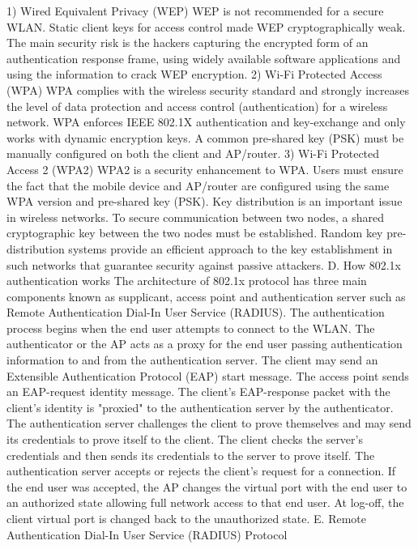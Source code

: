 1) Wired Equivalent Privacy (WEP)
WEP is not recommended for a secure WLAN. Static client keys for access control made WEP cryptographically weak. The main security risk is the hackers capturing the encrypted form of an authentication response frame, using widely available software applications and using the information to crack WEP encryption. 
2) Wi-Fi Protected Access (WPA)
WPA complies with the wireless security standard and strongly increases the level of data protection and access control (authentication) for a wireless network. WPA enforces IEEE 802.1X authentication and key-exchange and only works with dynamic encryption keys. A common pre-shared key (PSK) must be manually configured on both the client and AP/router.
3) Wi-Fi Protected Access 2 (WPA2)
WPA2 is a security enhancement to WPA. Users must ensure the fact that the mobile device and AP/router are configured using the same WPA version and pre-shared key (PSK).
Key distribution is an important issue in wireless networks. To secure communication between two nodes, a shared cryptographic key between the two nodes must be established. Random key pre-distribution systems provide an efficient approach to the key establishment in such networks that guarantee security against passive attackers.
D. How 802.1x authentication works
The architecture of 802.1x protocol has three main components known as supplicant, access point and authentication server such as Remote Authentication Dial-In User Service (RADIUS). The authentication process begins when the end user attempts to connect to the WLAN. The authenticator or the AP acts as a proxy for the end user passing authentication information to and from the authentication server. The client may send an Extensible Authentication Protocol (EAP) start message. The access point sends an EAP-request identity message. The client's EAP-response packet with the client's identity is "proxied" to the authentication server by the authenticator. The authentication server challenges the client to prove themselves and may send its credentials to prove itself to the client. The client checks the server's credentials and then sends its credentials to the server to prove itself. The authentication server accepts or rejects the client's request for a connection. If the end user was accepted, the AP changes the virtual port with the end user to an authorized state allowing full network access to that end user. At log-off, the client virtual port is changed back to the unauthorized state.
E. Remote Authentication Dial-In User Service (RADIUS) Protocol

